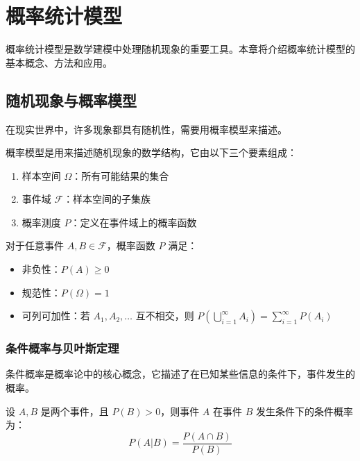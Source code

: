 
\chapter{概率统计模型}\label{chap:probability-statistics}

概率统计模型是数学建模中处理随机现象的重要工具。本章将介绍概率统计模型的基本概念、方法和应用。

\section{随机现象与概率模型}\label{sec:random-phenomena}

在现实世界中，许多现象都具有随机性，需要用概率模型来描述。

\begin{definition}[概率模型]\label{def:probability-model}
概率模型是用来描述随机现象的数学结构，它由以下三个要素组成：
\begin{enumerate}
    \item 样本空间 $\Omega$：所有可能结果的集合
    \item 事件域 $\mathcal{F}$：样本空间的子集族
    \item 概率测度 $P$：定义在事件域上的概率函数
\end{enumerate}
\end{definition}

\begin{infobox}[title=概率的基本性质]
对于任意事件 $A, B \in \mathcal{F}$，概率函数 $P$ 满足：
\begin{itemize}
    \item 非负性：$P(A) \geq 0$
    \item 规范性：$P(\Omega) = 1$
    \item 可列可加性：若 $A_1, A_2, \ldots$ 互不相交，则 $P(\bigcup_{i=1}^{\infty} A_i) = \sum_{i=1}^{\infty} P(A_i)$
\end{itemize}
\end{infobox}

\subsection{条件概率与贝叶斯定理}

条件概率是概率论中的核心概念，它描述了在已知某些信息的条件下，事件发生的概率。

\begin{definition}[条件概率]\label{def:conditional-probability}
设 $A, B$ 是两个事件，且 $P(B) > 0$，则事件 $A$ 在事件 $B$ 发生条件下的条件概率为：
\[
P(A|B) = \frac{P(A \cap B)}{P(B)}
\]
\end{definition}

